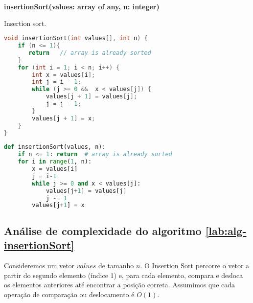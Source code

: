 \begin{center}
\begin{minipage}{.9\linewidth}
\begin{algorithm}[H]
\DontPrintSemicolon
\textbf{insertionSort(values: array of any, n: integer)}

\caption{Insertion sort.}
\label{lab:alg-insertionSort}
\end{algorithm}
\end{minipage}
\end{center}
    

\begin{lstlisting}[language=C,caption={insertion sort em C},captionpos=t]
void insertionSort(int values[], int n) {
    if (n <= 1){
       return   // array is already sorted
    }  
    for (int i = 1; i < n; i++) {
        int x = values[i];
        int j = i - 1;
        while (j >= 0 &&  x < values[j]) {
            values[j + 1] = values[j];
            j = j - 1;
        }
        values[j + 1] = x;
    }
}    
\end{lstlisting}

\begin{lstlisting}[language=python,caption={insertion sort em Python},captionpos=t]
def insertionSort(values, n):
    if n <= 1: return  # array is already sorted
    for i in range(1, n):  
        x = values[i]  
        j = i-1
        while j >= 0 and x < values[j]:  
            values[j+1] = values[j]  
            j -= 1
        values[j+1] = x  
\end{lstlisting}

\subsection{Análise de complexidade do algoritmo \ref{lab:alg-insertionSort}}
Consideremos um vetor $values$ de tamanho $n$. O Insertion Sort percorre o vetor a partir do segundo elemento (índice 1) e, para cada elemento, compara e desloca os elementos anteriores até encontrar a posição correta. Assumimos que cada operação de comparação ou deslocamento é $O(1)$.

